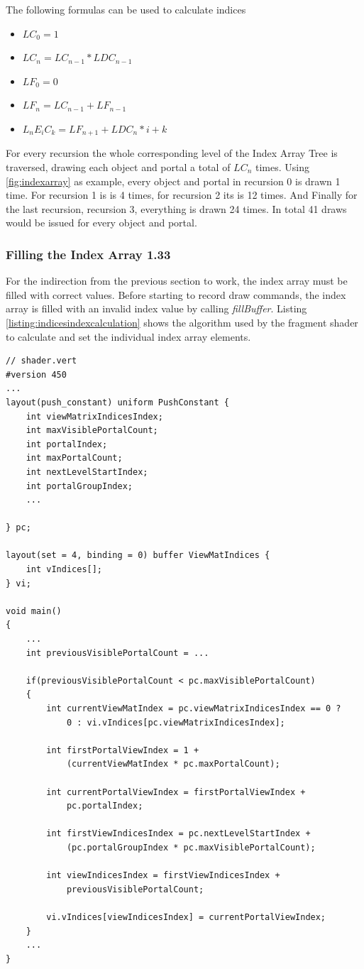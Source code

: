 The following formulas can be used to calculate indices

\begin{itemize}
	\item $LC_0 = 1$
	\item $LC_n = LC_{n-1} * LDC_{n-1}$
	\item $LF_0 = 0$
	\item $LF_n = LC_{n-1} + LF_{n-1}$
	\item $L_nE_iC_k = LF_{n+1} + LDC_{n} * i + k$
\end{itemize}

For every recursion the whole corresponding level of the Index Array Tree is traversed, drawing each object and portal a total of $LC_n$ times. Using \ref{fig:indexarray} as example, every object and portal in recursion 0 is drawn 1 time. For recursion 1 is is 4 times, for recursion 2 its is 12 times. And Finally for the last recursion, recursion 3, everything is drawn 24 times. In total 41 draws would be issued for every object and portal.

\subsubsection{Filling the Index Array 1.33}
For the indirection from the previous section to work, the index array must be filled with correct values. Before starting to record draw commands, the index array is filled with an invalid index value by calling \textit{fillBuffer}. Listing \ref{listing:indicesindexcalculation} shows the algorithm used by the fragment shader to calculate and set the individual index array elements.

\begin{lstlisting}[caption={Calculating Indices Index}, label=listing:indicesindexcalculation]
// shader.vert
#version 450
...
layout(push_constant) uniform PushConstant {	
	int viewMatrixIndicesIndex;
	int maxVisiblePortalCount;
	int portalIndex;
	int maxPortalCount;
	int nextLevelStartIndex;
	int portalGroupIndex;
	...

} pc;

layout(set = 4, binding = 0) buffer ViewMatIndices {
	int vIndices[];
} vi;

void main()
{
	...
	int previousVisiblePortalCount = ...
	
	if(previousVisiblePortalCount < pc.maxVisiblePortalCount)
	{
		int currentViewMatIndex = pc.viewMatrixIndicesIndex == 0 ? 
			0 : vi.vIndices[pc.viewMatrixIndicesIndex];
		
		int firstPortalViewIndex = 1 +
			(currentViewMatIndex * pc.maxPortalCount);
		
		int currentPortalViewIndex = firstPortalViewIndex +
			pc.portalIndex;
		
		int firstViewIndicesIndex = pc.nextLevelStartIndex +
			(pc.portalGroupIndex * pc.maxVisiblePortalCount);
			
		int viewIndicesIndex = firstViewIndicesIndex +
			previousVisiblePortalCount;
			
		vi.vIndices[viewIndicesIndex] = currentPortalViewIndex;
	}
	...	
}

\end{lstlisting}


